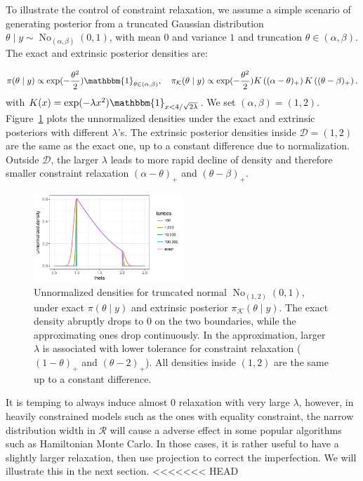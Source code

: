 \documentclass[10pt]{article}
\newcommand{\mc}[1]{\mathcal{#1}}
\DeclareMathOperator{\No}{No}
\DeclareMathOperator{\1}{\mathbbm{1}}
\begin{document}
To illustrate the control of constraint relaxation, we assume a simple scenario of generating posterior from a truncated Gaussian distribution $\theta \mid y \sim \No_{(\alpha,\beta)}(0,1)$, with mean $0$ and variance $1$ and truncation $\theta\in (\alpha,\beta)$. The exact and extrinsic posterior densities are:

$$\pi(\theta\mid y)\propto \exp(-\frac{\theta^2}{2}) \mathbbm{1}_{\theta\in(\alpha,\beta)}, \quad \pi_{\mc K}(\theta\mid y)\propto \exp(-\frac{\theta^2}{2}) K \left ( (\alpha - \theta)_+ \right) K \left ( ( \theta - \beta)_+ \right).$$
with $K(x)= \exp( - \lambda x^2)\mathbbm{1}_{x<4/\sqrt{2\lambda}}$. We set $(\alpha, \beta)=(1,2)$. Figure~\ref{truncated_normal} plots the unnormalized densities under the exact and extrinsic posteriors with different $\lambda$'s. The extrinsic posterior densities inside $\mc D = (1,2)$ are the same as the exact one, up to a constant difference due to normalization. Outside $\mc D$, the larger $\lambda$ leads to more rapid decline of density and therefore smaller constraint relaxation $(\alpha - \theta)_+ $ and $ ( \theta - \beta)_+$.

\begin{figure}[H]
 \centering
 \includegraphics[width=0.5\textwidth]{density_truncated_normal}
\caption{Unnormalized densities for truncated normal $\No_{(1,2)}(0,1)$, under exact $\pi(\theta\mid y)$ and extrinsic posterior $\pi_{\mc K}(\theta\mid y)$. The exact density abruptly drops to $0$ on the two boundaries, while the approximating ones drop continuously. In the approximation, larger $\lambda$ is associated with lower tolerance for constraint relaxation ($( 1-\theta )_+$ and $( \theta - 2)_+$). All densities inside $(1,2)$ are the same up to a constant difference.}
\label{truncated_normal}
\end{figure}

It is temping to always induce almost $0$ relaxation with very large $\lambda$, however, in heavily constrained models such as the ones with equality constraint, the narrow distribution width in $\mc R$ will cause a adverse effect in some popular algorithms such as Hamiltonian Monte Carlo. In those cases, it is rather useful to have a slightly larger relaxation, then use projection to correct the imperfection. We will illustrate this in the next section.
<<<<<<< HEAD
\end{document}
